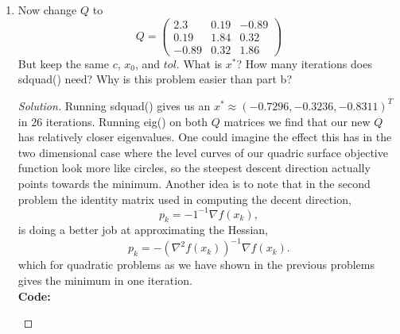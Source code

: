 \documentclass[12pt]{article}
\makeatletter
\theoremstyle{homework}
\newenvironment{exercise}[1]
{\def\@currentlabel{#1}\exercisecore}
{\endexercisecore}
\makeatother
\begin{document}
\begin{exercise}{P14}
\begin{enumerate}
    \item[(c)] Now change $Q$ to 
    \begin{equation*}
      Q = \begin{pmatrix}
        2.3 & 0.19 & -0.89\\
        0.19 & 1.84 & 0.32\\
       -0.89 & 0.32 & 1.86
      \end{pmatrix}
    \end{equation*}
    But keep the same  $c$, $x_0$, and $tol$. What is $x^*$? How many iterations does sdquad() need? Why is this problem easier than part b?
      \begin{proof}[Solution]
        Running sdquad() gives us an $x^* \approx (-0.7296,-0.3236,-0.8311)^T$ in 26 iterations. Running eig() on both $Q$ matrices we find that 
        our new $Q$ has relatively closer eigenvalues. One could imagine the effect this has in the two dimensional case where the level curves of our 
        quadric surface objective function look more like circles, so the steepest descent direction actually points towards the minimum. Another idea is to note that in the second problem the 
        identity matrix used in computing the decent direction, 
        \begin{equation*}
          p_k = -1^{-1}\nabla f(x_k), 
        \end{equation*}
        is doing a better job at approximating the Hessian, 
        \begin{equation*}
          p_k = -(\nabla^2f(x_k))^{-1}\nabla f(x_k).
        \end{equation*}
        which for quadratic problems as we have shown in the previous problems gives the minimum in one iteration.\\
      \textbf{Code:}
      \begin{center}
        
      \end{center}
    \end{proof}
  \end{enumerate}
  \end{exercise}
\vspace{.5in}
\end{document}
